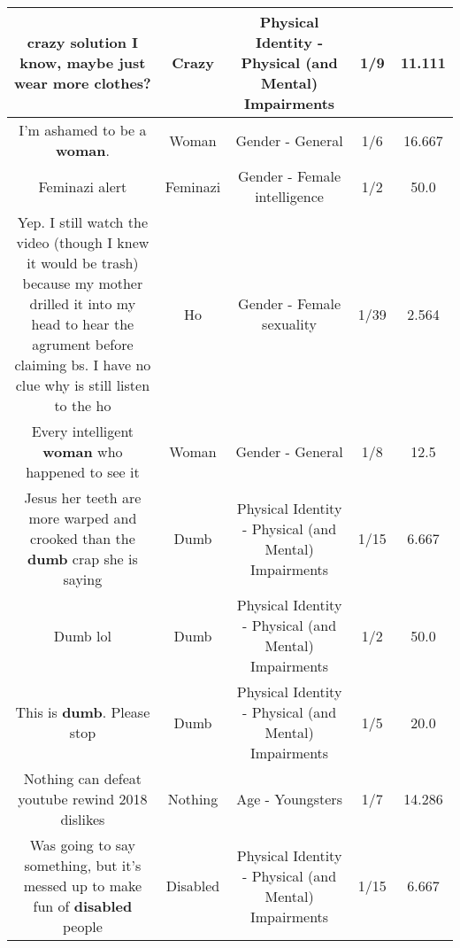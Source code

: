 \documentclass[11pt]{article}
\newlength\mylength
\begin{document}
\begin{center}
\begin{longtable}{|C{.65\mylength}|C{.30\mylength}|C{.12\mylength}|C{.12\mylength}|C{.12\mylength}|}
  \small crazy solution I know, maybe just wear more clothes?\normalsize   & Crazy & Physical Identity - Physical (and Mental) Impairments & 1/9 & 11.111 \\  \hline
  \small I'm ashamed to be a \textbf{woman}.\normalsize   & Woman & Gender - General & 1/6 & 16.667 \\  \hline
  \small Feminazi alert\normalsize   & Feminazi & Gender - Female intelligence & 1/2 & 50.0 \\  \hline
  \small Yep. I still watch the video (though I knew it would be trash) because my mother drilled it into my head to hear the agrument before claiming bs. I have no clue why is still listen to the ho\normalsize   & Ho & Gender - Female sexuality & 1/39 & 2.564 \\  \hline
  \small Every intelligent \textbf{woman} who happened to see it\normalsize   & Woman & Gender - General & 1/8 & 12.5 \\  \hline
  \small Jesus her teeth are more warped and crooked than the \textbf{dumb} crap she is saying\normalsize   & Dumb & Physical Identity - Physical (and Mental) Impairments & 1/15 & 6.667 \\  \hline
  \small Dumb lol\normalsize   & Dumb & Physical Identity - Physical (and Mental) Impairments & 1/2 & 50.0 \\  \hline
  \small This is \textbf{dumb}. Please stop\normalsize   & Dumb & Physical Identity - Physical (and Mental) Impairments & 1/5 & 20.0 \\  \hline
  \small Nothing can defeat youtube rewind 2018 dislikes\normalsize   & Nothing & Age - Youngsters & 1/7 & 14.286 \\  \hline
  \small Was going to say something, but it's messed up to make fun of \textbf{disabled} people\normalsize   & Disabled & Physical Identity - Physical (and Mental) Impairments & 1/15 & 6.667 \\  \hline

\end{longtable}
\end{center}
\end{document}
